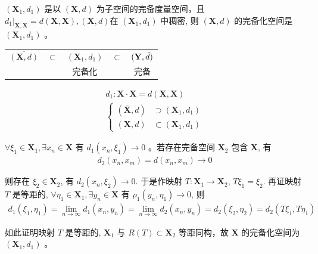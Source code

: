 \begin{proposition}
    $\left(\mathbf{X}_1, d_1\right)$ 是以 $(\mathbf{X}, d)$ 为子空间的完备度量空间，且 $\left.d_1\right|_{\mathbf{X}, \mathbf{X}}=d(\mathbf{X}, \mathbf{X}),(\mathbf{X}, d)$在 $\left(\mathbf{X}_1, d_1\right)$ 中稠密, 则 $(\mathbf{X}, d)$ 的完备化空间是 $\left(\mathbf{X}_1, d_1\right)$ 。
    \begin{center}
        \begin{tabular}{ccccc}
        $\overline{(\mathbf{X}, d)}$ & $\subset$ & $(\mathbf{X}_1, d_1)$ & $\subset$ & $(\mathbf{Y}, \Tilde{d})$  \\
        & & 完备化 & & 完备 \\
        \end{tabular}
    \end{center}
    \begin{align*}
        d_1: \mathbf{X}\cdot \mathbf{X} = d(\mathbf{X}, \mathbf{X}) \\
        \left\lbrace\begin{array}{cc}
        (\overline{\mathbf{X}}, d) &\supset (\mathbf{X}_1, d_1)  \\
        (\mathbf{X}, d) &\subset (\mathbf{X}_1, d_1) 
        \end{array} \right.
    \end{align*}
\end{proposition}
\begin{solution}
    $\forall \xi_1 \in \mathbf{X}_1, \exists x_n \in \mathbf{X}$ 有 $d_1\left(x_n, \xi_1\right) \rightarrow 0$ 。若存在完备空间 $\mathbf{X}_2$ 包含 $\mathbf{X}$, 有
    \begin{align*}
        d_2\left(x_n, x_m\right)=d\left(x_n, x_m\right) \rightarrow 0
    \end{align*}

    则存在 $\xi_2 \in \mathbf{X}_2$, 有 $d_2\left(x_n, \xi_2\right) \rightarrow 0$. 于是作映射 $T: \mathbf{X}_1 \rightarrow \mathbf{X}_2$, $T \xi_1=\xi_2$. 再证映射 $T$ 是等距的, $\forall \eta_1 \in \mathbf{X}_1, \exists y_n \in \mathbf{X}$ 有 $\rho_1\left(y_n, \eta_1\right) \rightarrow 0$, 则
    \begin{align*}
        d_1\left(\xi_1, \eta_1\right)=\lim\limits_{n \rightarrow \infty} d_1\left(x_n, y_n\right)=\lim\limits_{n \rightarrow \infty} d_2\left(x_n, y_n\right)=d_2\left(\xi_2, \eta_2\right) = d_2(T\xi_1, T\eta_1)
    \end{align*}

    如此证明映射 $T$ 是等距的, $\mathbf{X}_1$ 与 $R(T) \subset \mathbf{X}_2$ 等距同构，故 $\mathbf{X}$ 的完备化空间为 $\left(\mathbf{X}_1, d_1\right)$ 。
\end{solution}

